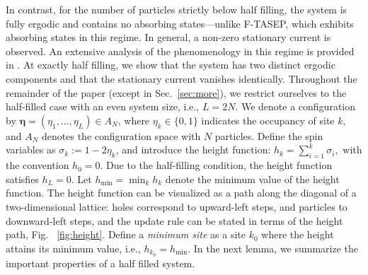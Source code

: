 \documentclass[pdflatex,sn-mathphys-num]{sn-jnl}
\theoremstyle{definition}
\theoremstyle{remark}
\numberwithin{equation}{section}
\begin{document}
In contrast, for the number of particles strictly below half filling, the system is fully ergodic and contains no absorbing states—unlike F-TASEP, which exhibits absorbing states in this regime. In general, a non-zero stationary current is observed. An extensive analysis of the phenomenology in this regime is provided in \cite{grosskinsky2025long}.
At exactly half filling, we show that the system has two distinct ergodic components and that the stationary current vanishes identically.
Throughout the remainder of the paper (except in Sec.~\ref{sec:more}), we restrict ourselves to the half-filled case with an even system size, i.e., \(L = 2N\). We denote a configuration by \( \boldsymbol{\eta} = (\eta_1, \dots, \eta_L) \in A_N \), where \( \eta_k \in \{0, 1\} \) indicates the occupancy of site \(k\), and $A_N$ denotes the configuration space with $N$ particles. Define the spin variables as \( \sigma_k := 1 - 2\eta_k \), and introduce the height function:
$    h_k = \sum_{i=1}^{k} \sigma_i,$
with the convention \( h_0 = 0 \). Due to the half-filling condition, the height function satisfies \( h_L = 0 \).
Let \( h_{\text{min}} = \min_k h_k \) denote the minimum value of the height function.
The height function can be visualized as a path along the diagonal of a two-dimensional lattice: holes correspond to upward-left steps, and particles to downward-left steps, and the update rule can be stated in terms of the height path, Fig. ~\ref{fig:height}. Define a \textit{minimum site}  as a site \( k_0 \) where the height attains its minimum value, i.e., \( h_{k_0} = h_{\text{min}} \).
In the next lemma, we summarize the important properties of a half filled system.
\end{document}
